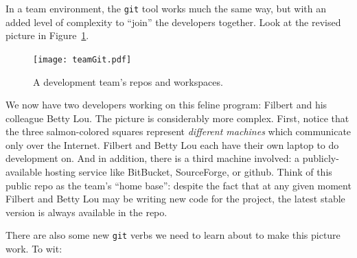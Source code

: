 In a team environment, the \texttt{git} tool works much the same way, but with
an added level of complexity to ``join'' the developers together. Look at the
revised picture in Figure~\ref{fig:teamGit}.

\begin{figure}
\centering
\texttt{[image: teamGit.pdf]}  %
\caption{A development team's repos and workspaces.}
\label{fig:teamGit}
\end{figure}

We now have two developers working on this feline program: Filbert and his
colleague Betty Lou. The picture is considerably more complex. First, notice
that the three salmon-colored squares represent \textit{different machines}
which communicate only over the Internet. Filbert and Betty Lou each have
their own laptop to do development on. And in addition, there is a third
machine involved: a publicly-available hosting service like BitBucket,
SourceForge, or github. Think of this public repo as the team's ``home base'':
despite the fact that at any given moment Filbert and Betty Lou may be writing
new code for the project, the latest stable version is always available in the
repo.

There are also some new \texttt{git} verbs we need to learn about to make this
picture work. To wit:

